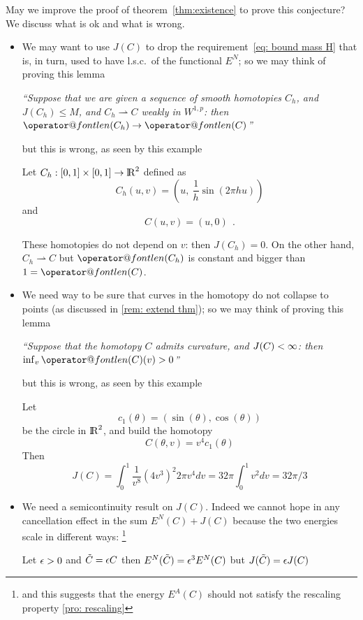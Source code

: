 \documentclass[twoside,a4paper,english]{article}
\makeatletter
\def\wto{\rightharpoonup}
\def\len{\mathop{\operator@font len}\nolimits}
\makeatother
\begin{document}
May we improve the proof of theorem~\ref{thm:existence}
to prove this conjecture? We discuss what is 
ok and what is wrong.
\begin{itemize}
\item We may want to use $J(C)$ to drop the requirement~\eqref{eq: bound mass H}
  that is, in turn, used to have l.s.c.\ of the functional $E^N$;
  so we may think of proving this lemma
  \begin{center}
    \emph{``Suppose that we are given a sequence of
      smooth homotopies $C_h$, 
      and $J(C_h)\le M$, and $C_h\wto C$ weakly in $W^{1,p}$: 
      then $\len(C_h)\to \len(C)$''}
  \end{center}
  but this is wrong, as seen by this example
  \begin{Example}\def\t{u}
    Let $C_h:[0,1]\times[0,1]\to {\protect\mathrm{l\hskip-0.15em R}}^2$ defined as
    \[ C_h(\t,v) = \left (\t,~ \frac 1 h \sin(2\pi h\t) \right) \]
    and
    \[ C(\t,v) = (\t,0)~~.\]

    These homotopies 
    do not depend on $v$: then 
    $J(C_h) = 0$. On the other hand, $C_h\wto C$ but $\len(C_h)$ is
    constant and bigger than $1=\len(C)$.
  \end{Example}
  
\item We need way to be sure that curves in the homotopy do
  not collapse to points (as discussed in \ref{rem: extend thm});
  so we may think of proving this lemma
  \begin{center}
    \emph{``Suppose that the homotopy $C$ admits curvature,
      and $J(C)<\infty$: then $\inf_v\len(C)(v)>0$''}
  \end{center}
  but this is wrong, as seen by this example
  \begin{Example}\def\t{\theta}
    Let \[c_1(\t)=(\sin(\t),\cos(\t) )\]
    be the circle in ${\protect\mathrm{l\hskip-0.15em R}}^2$, and build the homotopy
    \[ C(\t,v)=v^4 c_1(\t)\]
    Then
    \[ J(C) = \int_0^1 \frac 1{v^8} (4v^3)^2  2\pi v^4 dv =
    32\pi \int_0^1 v^2dv=
    32\pi/3    \]
  \end{Example}


\item We need a semicontinuity result on $J(C)$.
  Indeed we cannot hope in any cancellation effect
  in the sum $E^N(C)+J(C)$ because the two energies scale
  in different ways:
  \footnote{and this suggests that the  energy $E^A(C)$ 
    should not satisfy the rescaling property  \vref{pro: rescaling}}
  \begin{Remark}[rescaling]
    Let $\epsilon>0$ and 
    $\tilde C= \epsilon C$ then $E^N(\tilde C)=\epsilon^3 E^N(C)$
    but  $J(\tilde C)=\epsilon J(C)$
  \end{Remark}


\end{itemize}
\end{document}
